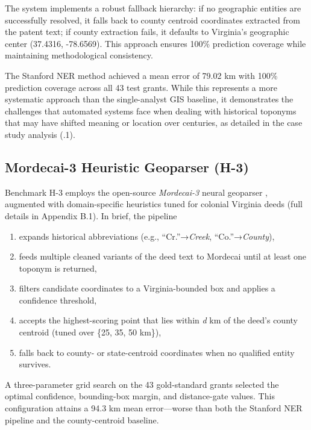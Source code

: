 The system implements a robust fallback hierarchy: if no geographic
entities are successfully resolved, it falls back to county centroid
coordinates extracted from the patent text; if county extraction fails,
it defaults to Virginia's geographic center (37.4316, -78.6569). \DIFaddbegin {}\DIFaddend This approach ensures 100\%
prediction coverage while maintaining methodological consistency.

The Stanford NER method achieved a mean error of 79.02 km with 100\%
prediction coverage across all 43 test grants. While this represents a
more systematic approach than the single-analyst GIS baseline, it
demonstrates the challenges that automated systems face when dealing
with historical toponyms that may have shifted meaning or location over
centuries, as detailed in the case study analysis (\DIFdelbegin {}\DIFdelend \DIFaddbegin {}.1).

\subsection{Mordecai-3 Heuristic Geoparser
(H-3)}\label{mordecai-3-heuristic-geoparser-h-3}

Benchmark H-3 employs the open-source \emph{Mordecai-3} neural geoparser
\citep{halterman2023mordecai}, augmented with domain-specific heuristics
tuned for colonial Virginia deeds (full details in Appendix B.1). In
brief, the pipeline

\begin{enumerate}
\def\labelenumi{\arabic{enumi}.}
\tightlist
\item
  expands historical abbreviations (e.g., ``Cr.''→\emph{Creek},
  ``Co.''→\emph{County}),
\item
  feeds multiple cleaned variants of the deed text to Mordecai until at
  least one toponym is returned,
\item
  filters candidate coordinates to a Virginia-bounded box and applies a
  confidence threshold,
\item
  accepts the highest-scoring point that lies within \emph{d} km of the
  deed's county centroid (tuned over \{25, 35, 50 km\}),
\item
  falls back to county- or state-centroid coordinates when no qualified
  entity survives.
\end{enumerate}

A three-parameter grid search on the 43 gold-standard grants selected
the optimal confidence, bounding-box margin, and distance-gate values.
This configuration attains a 94.3 km mean error---worse than both the
Stanford NER pipeline and the county-centroid baseline.

